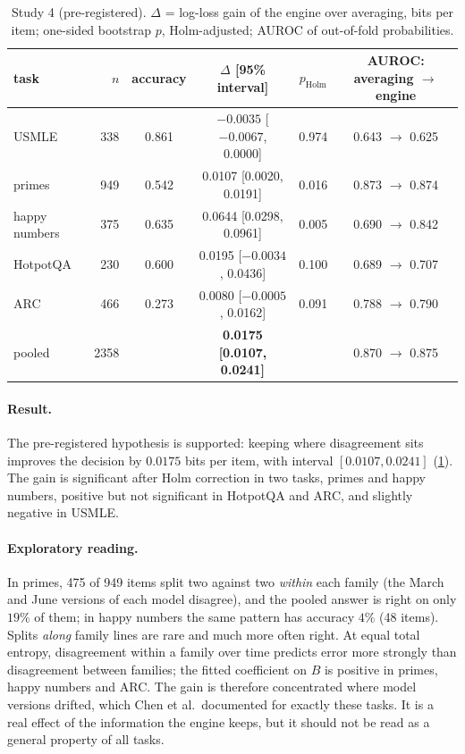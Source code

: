 \documentclass[11pt]{article}
\theoremstyle{definition}\newtheorem{definition}{Definition}
\begin{document}
\begin{table}[t]\centering\small
\caption{Study 4 (pre-registered). $\Delta$ = log-loss gain of the engine over averaging, bits per item; one-sided bootstrap $p$,
Holm-adjusted; AUROC of out-of-fold probabilities.}
\label{tab:s4}
\begin{tabular}{lrcccc}\toprule
task & $n$ & accuracy & $\Delta$ [95\% interval] & $p_{\mathrm{Holm}}$ & AUROC: averaging $\to$ engine\\\midrule
USMLE & 338 & 0.861 & $-0.0035$ [$-0.0067$, 0.0000] & 0.974 & 0.643 $\to$ 0.625\\
primes & 949 & 0.542 & 0.0107 [0.0020, 0.0191] & 0.016 & 0.873 $\to$ 0.874\\
happy numbers & 375 & 0.635 & 0.0644 [0.0298, 0.0961] & 0.005 & 0.690 $\to$ 0.842\\
HotpotQA & 230 & 0.600 & 0.0195 [$-0.0034$, 0.0436] & 0.100 & 0.689 $\to$ 0.707\\
ARC & 466 & 0.273 & 0.0080 [$-0.0005$, 0.0162] & 0.091 & 0.788 $\to$ 0.790\\\midrule
pooled & 2358 & & \textbf{0.0175 [0.0107, 0.0241]} & & 0.870 $\to$ 0.875\\\bottomrule
\end{tabular}
\end{table}

\paragraph{Result.} The pre-registered hypothesis is supported: keeping where disagreement sits improves the decision by $0.0175$ bits
per item, with interval $[0.0107,0.0241]$ (\cref{tab:s4}). The gain is significant after Holm correction in two tasks, primes and happy
numbers, positive but not significant in HotpotQA and ARC, and slightly negative in USMLE.

\paragraph{Exploratory reading.} In primes, 475 of 949 items split two against two \emph{within} each family (the March and June
versions of each model disagree), and the pooled answer is right on only $19\%$ of them; in happy numbers the same pattern has accuracy
$4\%$ (48 items). Splits \emph{along} family lines are rare and much more often right. At equal total entropy, disagreement within a
family over time predicts error more strongly than disagreement between families; the fitted coefficient on $B$ is positive in primes,
happy numbers and ARC. The gain is therefore concentrated where model versions drifted, which Chen et al.\ documented for exactly these
tasks. It is a real effect of the information the engine keeps, but it should not be read as a general property of all tasks.
\end{document}
